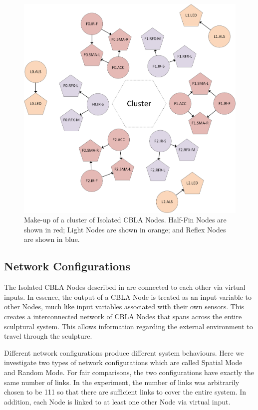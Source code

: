 \begin{figure} [!htbp]
	\centering
	\includegraphics[width=1.0\textwidth]{"fig/validations/Isolated CBLA Nodes"}
	\caption[Make-up of a cluster of Isolated CBLA Nodes]{Make-up of a cluster of Isolated CBLA Nodes. Half-Fin Nodes are shown in red; Light Nodes are shown in orange; and Reflex Nodes are shown in blue.}
	\label{fig:Isolated CBLA Nodes}
\end{figure}


\subsection{Network Configurations}

The Isolated CBLA Nodes described in  are connected to each other via virtual inputs. In essence, the output of a CBLA Node is treated as an input variable to other Nodes, much like input variables associated with their own sensors. This creates a interconnected network of CBLA Nodes that spans across the entire sculptural system. This allows information regarding the external environment to travel through the sculpture. 

Different network configurations produce different system behaviours. Here we investigate two types of network configurations which are called Spatial Mode and Random Mode. For fair comparisons, the two configurations have exactly the same number of links. In the experiment, the number of links was arbitrarily chosen to be 111 so that there are sufficient links to cover the entire system. In addition, each Node is linked to at least one other Node via virtual input. 

